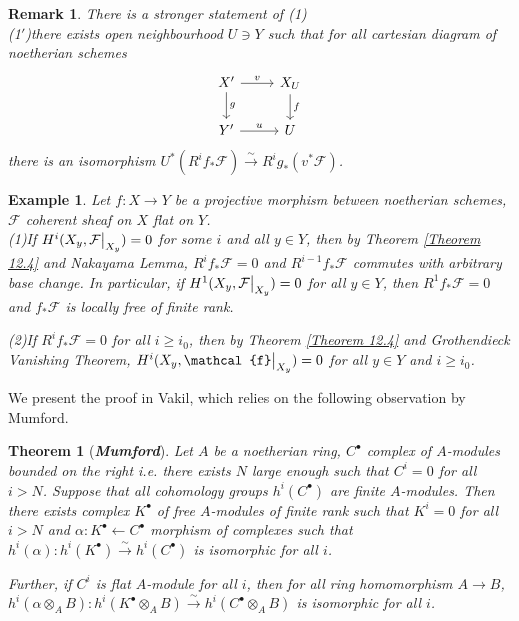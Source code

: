 \documentclass{ctexart}
\newtheorem{remark}{Remark}[section]
\newtheorem{theorem}{Theorem}[section]
\newtheorem{example}{Example}[section]
\begin{document}
\begin{remark}
    There is a stronger statement of (1) \\
    (1$'$)there exists open neighbourhood $U\ni Y$ such that for all cartesian diagram of noetherian schemes 
    \begin{equation*}
        \begin{tikzcd}
            X' \arrow[r, "v"] \arrow[d, "g"] &
            X_{U} \arrow[d, "f"] \\
            Y' \arrow[r, "u"] &
            U
        \end{tikzcd}
    \end{equation*}
    there is an isomorphism $U^{\ast}(R^{i}f_{\ast}\mathcal{F}) \overset{\sim}{\longrightarrow} R^{i}g_{\ast}(v^{\ast}\mathcal{F})$.
\end{remark}
\begin{example}
    Let $f: X \longrightarrow Y$ be a projective morphism between noetherian schemes, $\mathcal{F}$ coherent sheaf on $X$ flat on $Y$. \\
    (1)If $H^{i}(X_{y}, \mathcal{F}\big{|}_{X_{y}}) = 0$ for some $i$ and all $y\in Y$, then by Theorem \ref{Theorem 12.4} and Nakayama Lemma, 
    $R^{i}f_{\ast}\mathcal{F} = 0$ and $R^{i - 1}f_{\ast}\mathcal{F}$ commutes with arbitrary base change.
    In particular, if $H^{1}(X_{y}, \mathcal{F}\big{|}_{X_{y}}) = 0$ for all $y\in Y$, then $R^{1}f_{\ast}\mathcal{F} = 0$ and $f_{\ast}\mathcal{F}$ is locally free of finite rank.
    \par
    (2)If $R^{i}f_{\ast}\mathcal{F} = 0$ for all $i \ge i_{0}$,
    then by Theorem \ref{Theorem 12.4} and Grothendieck Vanishing Theorem, 
    $H^{i}(X_{y}, \mathcal{f}\big{|}_{X_{y}}) = 0$ for all $y\in Y$ and $i \ge i_{0}$.
\end{example}
We present the proof in Vakil, which relies on the following observation by Mumford.
\begin{theorem}[\textbf{\emph{Mumford}}]
    Let $A$ be a noetherian ring, $C^{\bullet}$ complex of $A$-modules bounded on the right i.e. there exists $N$ large enough such that $C^{i} = 0$ for all $i > N$.
    Suppose that all cohomology groups $h^{i}(C^{\bullet})$ are finite $A$-modules.
    Then there exists complex $K^{\bullet}$ of free $A$-modules of finite rank such that $K^{i} = 0$ for all $i > N$ and $\alpha: K^{\bullet} \longleftarrow C^{\bullet}$ morphism of complexes such that $h^{i}(\alpha): h^{i}(K^{\bullet}) \overset{\sim}{\longrightarrow} h^{i}(C^{\bullet})$ is isomorphic for all $i$.
    \par
    Further, if $C^{i}$ is flat $A$-module for all $i$, then for all ring homomorphism $A \longrightarrow B$,
    $h^{i}(\alpha \otimes_{A} B): h^{i}(K^{\bullet} \otimes_{A} B) \overset{\sim}{\longrightarrow} h^{i}(C^{\bullet} \otimes_{A} B)$ is isomorphic for all $i$.
    \label{Theorem 12.5}
\end{theorem}
\end{document}
